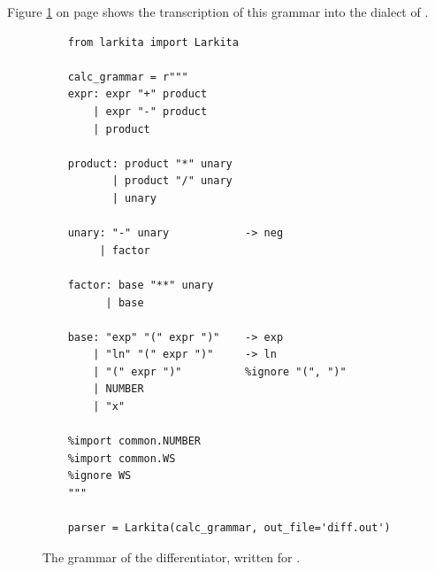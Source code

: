 \noindent
Figure \ref{fig:02-Differentiator.ipynb:grammar} on page \pageref{fig:02-Differentiator.ipynb:grammar}
shows the transcription of this grammar into the  dialect of .

\begin{figure}[!ht]
\centering
\begin{verbatim}
    from larkita import Larkita

    calc_grammar = r"""
    expr: expr "+" product
        | expr "-" product
        | product

    product: product "*" unary
           | product "/" unary
           | unary

    unary: "-" unary            -> neg
         | factor

    factor: base "**" unary
          | base

    base: "exp" "(" expr ")"    -> exp
        | "ln" "(" expr ")"     -> ln
        | "(" expr ")"          %ignore "(", ")"
        | NUMBER
        | "x"

    %import common.NUMBER
    %import common.WS
    %ignore WS
    """

    parser = Larkita(calc_grammar, out_file='diff.out')
\end{verbatim}
\vspace*{-0.3cm}
\caption{The grammar of the differentiator, written for .}
\label{fig:02-Differentiator.ipynb:grammar}
\end{figure}

